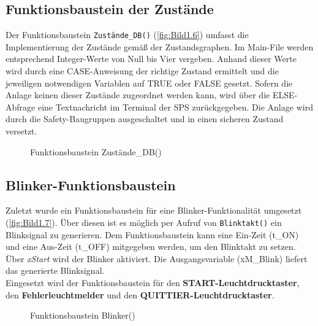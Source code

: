 \subsection{Funktionsbaustein der Zustände}

Der Funktionsbaustein \texttt{Zustände_DB()} (\autoref{fig:Bild1.6}) umfasst die Implementierung der Zustände gemäß der Zustandsgraphen. Im Main-File werden entsprechend Integer-Werte von Null bis Vier vergeben. Anhand dieser Werte wird durch eine CASE-Anweisung der richtige Zustand ermittelt und die jeweiligen notwendigen Variablen auf TRUE oder FALSE gesetzt. Sofern die Anlage keinen dieser Zustände zugeordnet werden kann, wird über die ELSE-Abfrage eine Textnachricht im Terminal der SPS zurückgegeben. Die Anlage wird durch die Safety-Baugruppen ausgeschaltet und in einen sicheren Zustand versetzt.

\begin{figure}[H]
   \centering
   \caption[Funktionsbaustein Zustände\_DB()]{Funktionsbaustein Zustände\_DB()}
   \label{fig:Bild1.6}
\end{figure}

\subsection{Blinker-Funktionsbaustein}

Zuletzt wurde ein Funktionsbaustein für eine Blinker-Funktionalität umgesetzt (\autoref{fig:Bild1.7}). Über diesen ist es möglich per Aufruf von \texttt{Blinktakt()} ein Blinksignal zu generieren. Dem Funktionsbaustein kann eine Ein-Zeit (t\_ON) und eine Aus-Zeit (t\_OFF) mitgegeben werden, um den Blinktakt zu setzen. Über \textit{xStart} wird der Blinker aktiviert. Die Ausgangsvariable (xM\_Blink) liefert das generierte Blinksignal. \\
Eingesetzt wird der Funktionsbaustein für den \textbf{START-Leuchtdrucktaster}, den \textbf{Fehlerleuchtmelder} und den \textbf{QUITTIER-Leuchtdrucktaster}.

\begin{figure}[H]
   \centering
   \caption[Funktionsbaustein Blinker()]{Funktionsbaustein Blinker()}
   \label{fig:Bild1.7}
\end{figure}